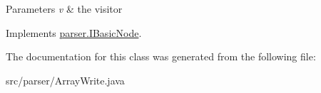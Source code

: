 \begin{DoxyParams}{Parameters}
{\em v} & the visitor \\
\hline
\end{DoxyParams}


Implements \hyperlink{interfaceparser_1_1_i_basic_node_af8790b7076c59e00781ba3d4118757cd}{parser.\+I\+Basic\+Node}.



The documentation for this class was generated from the following file\+:\begin{DoxyCompactItemize}
\item 
src/parser/Array\+Write.\+java\end{DoxyCompactItemize}
